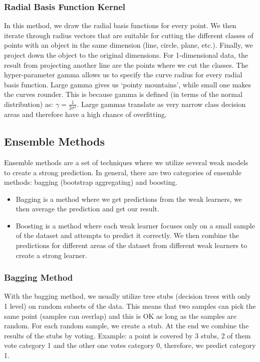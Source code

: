 \documentclass{article}
\begin{document}
\subsubsection{Radial Basis Function Kernel}
In this method, we draw the radial basis functions for every point. We then iterate through radius vectors that are suitable for cutting the different classes of points with an object in the same dimension (line, circle, plane, etc.). Finally, we project down the object to the original dimensions. For 1-dimensional data, the result from projecting another line are the points where we cut the classes. The hyper-parameter gamma allows us to specify the curve radius for every radial basis function. Large gamma gives us ‘pointy mountains’, while small one makes the curves rounder. This is because gamma is defined (in terms of the normal distribution) as: $\gamma = \frac{1}{2\sigma^2}$. Large gammas translate as very narrow class decision areas and therefore have a high chance of overfitting.

\subsection{Ensemble Methods}
Ensemble methods are a set of techniques where we utilize several weak models to create a strong prediction. In general, there are two categories of ensemble methods: bagging (bootstrap aggregating) and boosting.

\begin{itemize}
  \item Bagging is a method where we get predictions from the weak learners, we then average the prediction and get our result.
  \item Boosting is a method where each weak learner focuses only on a small sample of the dataset and attempts to predict it correctly. We then combine the predictions for different areas of the dataset from different weak learners to create a strong learner.
\end{itemize}

\subsubsection{Bagging Method}
With the bagging method, we usually utilize tree stubs (decision trees with only 1 level) on random subsets of the data. This means that two samples can pick the same point (samples can overlap) and this is OK as long as the samples are random. For each random sample, we create a stub. At the end we combine the results of the stubs by voting. Example: a point is covered by 3 stubs, 2 of them vote category 1 and the other one votes category 0, therefore, we predict category 1.
\end{document}

